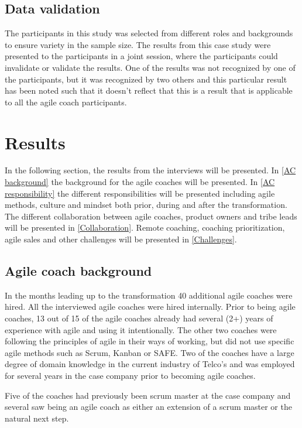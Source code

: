 \documentclass[11pt,a4paper]{report}
\begin{document}
\section{Data validation}
The participants in this study was selected from different roles and backgrounds to ensure variety in the sample size. The results from this case study were presented to the participants in a joint session, where the participants could invalidate or validate the results. One of the results was not recognized by one of the participants, but it was recognized by two others and this particular result has been noted such that it doesn't reflect that this is a result that is applicable to all the agile coach participants. 

\chapter{Results}
\label{results}

In the following section, the results from the interviews will be presented. In \autoref{AC background} the background for the agile coaches will be presented. In \autoref{AC responsibility} the different responsibilities will be presented including agile methods, culture and mindset both prior, during and after the transformation. The different collaboration between agile coaches, product owners and tribe leads will be presented in \autoref{Collaboration}. Remote coaching, coaching prioritization, agile sales and other challenges will be presented in \autoref{Challenges}.

\section{Agile coach background}
\label{AC background}
In the months leading up to the transformation 40 additional agile coaches were hired. All the interviewed agile coaches were hired internally. Prior to being agile coaches, 13 out of 15 of the agile coaches already had several (2+) years of experience with agile and using it intentionally. The other two coaches were following the principles of agile \cite{agileManifesto} in their ways of working, but did not use specific agile methods such as Scrum, Kanban or SAFE. Two of the coaches have a large degree of domain knowledge in the current industry of Telco's and was employed for several years in the case company prior to becoming agile coaches.

\noindent Five of the coaches had previously been scrum master at the case company and several saw being an agile coach as either an extension of a scrum master or the natural next step.
\end{document}
